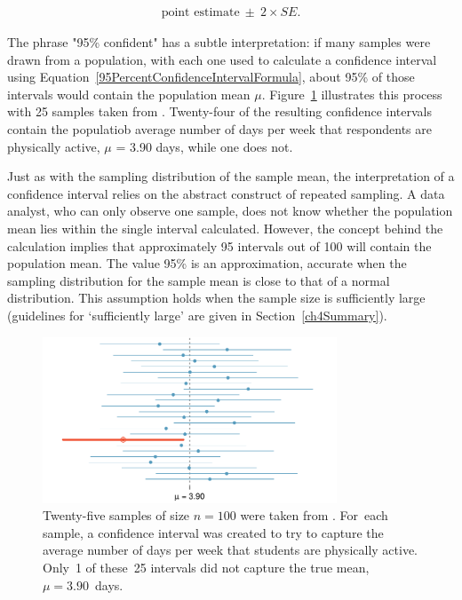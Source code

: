 \begin{spacing}{1.5}
\begin{align}
\text{point estimate}\ \pm\ 2\times SE.
\label{95PercentConfidenceIntervalFormula}
\end{align}

The phrase "95\% confident" has a subtle interpretation: if many samples were drawn from a population, with each one used to calculate a confidence interval using Equation~\ref{95PercentConfidenceIntervalFormula}, about 95\% of those intervals would contain the population mean $\mu$. Figure~\ref{95PercentConfidenceInterval} illustrates this process with 25 samples taken from . Twenty-four of the resulting confidence intervals contain the populatiob average number of days per week that respondents are physically active, $\mu$ = 3.90 days, while one does not. 

Just as with the sampling distribution of the sample mean, the interpretation of a confidence interval relies on the abstract construct of repeated sampling. A data analyst, who can only observe one sample, does not know whether the population mean lies within the single interval calculated. However, the concept behind the calculation implies that approximately 95 intervals out of 100 will contain the population mean. The value 95\% is an approximation, accurate when the sampling distribution for the sample mean is close to that of a normal distribution. This assumption holds when the sample size is sufficiently large (guidelines for `sufficiently large' are given in Section~\ref{ch4Summary}).

\begin{figure}[hht]
   \centering
   \includegraphics[width=0.78\textwidth]
{ch_inference_foundations_oi_biostat/figures/95PercentConfidenceInterval/95PercentConfidenceInterval}
   \caption{Twenty-five samples of size $n=100$ were taken from . For~each sample, a confidence interval was created to try to capture the average number of days per week that students are physically active. Only~1 of these~25 intervals did not capture the true mean, $\mu = 3.90$~days.}
   \label{95PercentConfidenceInterval}
\end{figure}


\end{spacing}
